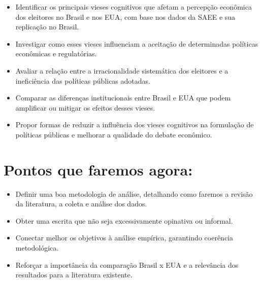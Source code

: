 \documentclass[
	article,
	12pt,
	oneside,
	a4paper,
	english,
	brazil,
	sumario=tradicional
]{abntex2}
\begin{document}
\begin{itemize}
    \item Identificar os principais vieses cognitivos que afetam a percepção econômica dos eleitores no Brasil e nos EUA, com base nos dados da SAEE e sua replicação no Brasil.
    \item Investigar como esses vieses influenciam a aceitação de determinadas políticas econômicas e regulatórias.
    \item Avaliar a relação entre a irracionalidade sistemática dos eleitores e a ineficiência das políticas públicas adotadas.
    \item Comparar as diferenças institucionais entre Brasil e EUA que podem amplificar ou mitigar os efeitos desses vieses.
    \item Propor formas de reduzir a influência dos vieses cognitivos na formulação de políticas públicas e melhorar a qualidade do debate econômico.
\end{itemize}



\newpage
\chapter{Pontos que faremos agora:}

\begin{itemize}
  \item Definir uma boa metodologia de análise, detalhando como faremos a revisão da literatura, a coleta e análise dos dados.
  \item Obter uma escrita que não seja excessivamente opinativa ou informal.
  \item Conectar melhor os objetivos à análise empírica, garantindo coerência metodológica.
  \item Reforçar a importância da comparação Brasil x EUA e a relevância dos resultados para a literatura existente.
\end{itemize}







\newpage

\renewcommand{\refname}{Referências}


\end{document}
